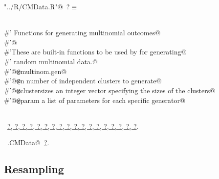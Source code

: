 \documentclass[reqno]{amsart}
\renewcommand{\NWtarget}[2]{\hypertarget{#1}{#2}}
\renewcommand{\NWlink}[2]{\hyperlink{#1}{#2}}
\begin{document}
\begin{flushleft} \small\label{scrap10}\raggedright\small
\NWtarget{nuweb?}{} \verb@"../R/CMData.R"@\nobreak\ {\footnotesize {?}}$\equiv$
\vspace{-1ex}
\begin{list}{}{} \item
\mbox{}\verb@@\\
\mbox{}\verb@#' Functions for generating multinomial outcomes@\\
\mbox{}\verb@#'@\\
\mbox{}\verb@#'These are built-in functions to be used by  for generating@\\
\mbox{}\verb@#' random multinomial data.@\\
\mbox{}\verb@#'@{\tt @}\verb@name multinom.gen@\\
\mbox{}\verb@#'@{\tt @}\verb@param n number of independent clusters to generate@\\
\mbox{}\verb@#'@{\tt @}\verb@param clustersizes an integer vector specifying the sizes of the clusters@\\
\mbox{}\verb@#'@{\tt @}\verb@param param a list of parameters for each specific generator@\\
\mbox{}\verb@NULL@\\
\mbox{}\verb@@{\NWsep}
\end{list}
\vspace{-1.5ex}
\footnotesize
\begin{list}{}{\setlength{\itemsep}{-\parsep}\setlength{\itemindent}{-\leftmargin}}
\item \NWtxtFileDefBy\ \NWlink{nuweb?}{?}\NWlink{nuweb?}{, ?}\NWlink{nuweb?}{, ?}\NWlink{nuweb?}{, ?}\NWlink{nuweb?}{, ?}\NWlink{nuweb?}{, ?}\NWlink{nuweb?}{, ?}\NWlink{nuweb?}{, ?}\NWlink{nuweb?}{, ?}\NWlink{nuweb?}{, ?}\NWlink{nuweb?}{, ?}\NWlink{nuweb?}{, ?}\NWlink{nuweb?}{, ?}\NWlink{nuweb?}{, ?}\NWlink{nuweb?}{, ?}\NWlink{nuweb?}{, ?}\NWlink{nuweb?}{, ?}\NWlink{nuweb?}{, ?}.
\item \NWtxtIdentsUsed\nobreak\  \verb@ran.CMData@\nobreak\ \NWlink{nuweb?}{?}.
\item{}
\end{list}
\vspace{4ex}
\end{flushleft}
\subsection{Resampling}
\end{document}
